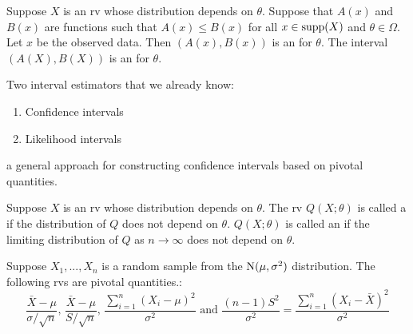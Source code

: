 \documentclass[notoc,notitlepage]{tufte-book}
\begin{document}
\begin{defn}
\label{defn:interval_estimators}
  Suppose $X$ is an rv whose distribution depends on $\theta$. Suppose that $A(x)$ and $B(x)$ are functions such that $A(x) \leq B(x)$ for all $x \in \operatorname{supp}(X)$ and $\theta \in \Omega$. Let $x$ be the observed data. Then $(A(x), B(x))$ is an  for $\theta$. The interval $(A(X), B(X))$ is an  for $\theta$.
\end{defn}

\begin{note}
  Two interval estimators that we already know:
  \begin{enumerate}
    \item Confidence intervals
    \item Likelihood intervals
  \end{enumerate}
\end{note}

 a general approach for constructing confidence intervals based on pivotal quantities.

\begin{defn}
\label{defn:pivotal_quantity}
  Suppose $X$ is an rv whose distribution depends on $\theta$. The rv $Q(X; \theta)$ is called a  if the distribution of $Q$ does not depend on $\theta$. $Q(X; \theta)$ is called an  if the limiting distribution of $Q$ as $n \to \infty$ does not depend on $\theta$.
\end{defn}

\begin{eg}[Example 6.16]\label{eg:6_16}
  Suppose $X_1, ..., X_n$ is a random sample from the $\operatorname{N}(\mu, \sigma^2)$ distribution. The following rvs are pivotal quantities.:
  \begin{equation*}
    \frac{\bar{X} - \mu}{\sigma / \sqrt{n}}, \, \frac{\bar{X} - \mu}{S / \sqrt{n}}, \, \frac{\sum\limits_{i=1}^{n} (X_i - \mu)^2}{\sigma^2} \text{ and } \frac{(n - 1) S^2}{\sigma^2} = \frac{\sum\limits_{i=1}^{n} (X_i - \bar{X})^2}{\sigma^2}
  \end{equation*}
\end{eg}
\end{document}
